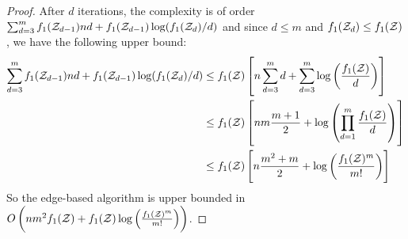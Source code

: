 \begin{proof}
    After $d$ iterations, the complexity is of order $\sum_{d=3}^m f_1(\mathcal{Z}_{d-1}) nd +  f_1(\mathcal{Z}_{d-1}) \log(f_1(\mathcal{Z}_d) / d)$ and since $d \leq m$ and $f_1(\mathcal{Z}_d) \leq f_1(\mathcal{Z})$, we have the following upper bound:
    \begin{align*}
        \sum_{d=3}^m f_1(\mathcal{Z}_{d-1}) nd +  f_1(\mathcal{Z}_{d-1}) \log(f_1(\mathcal{Z}_d) / d) &\leq  f_1(\mathcal{Z}) \left[ n \sum_{d=3}^m d + \sum_{d=3}^m \log\left(\frac{f_1(\mathcal{Z})}{d}\right) \right] \\
        &\leq  f_1(\mathcal{Z}) \left[ nm\frac{m+1}{2} +  \log\left(\prod_{d=1}^m\frac{f_1(\mathcal{Z})}{d}\right) \right] \\
        &\leq  f_1(\mathcal{Z}) \left[ n\frac{m^2+m}{2} +  \log\left(\frac{f_1(\mathcal{Z})^m}{m!}\right) \right]
    \end{align*}
    So the edge-based algorithm is upper bounded in $O\left( nm^2f_1(\mathcal{Z}) +  f_1(\mathcal{Z})\log\left(\frac{f_1(\mathcal{Z})^m}{m!}\right)\right)$.


\end{proof}
